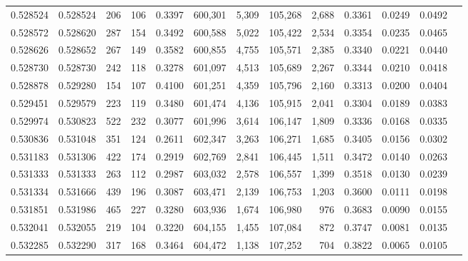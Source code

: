 \begin{tabular}{rrrrrrrrrrrrr}
0.528524 & 0.528524 &   206 &   106 &                                     0.3397 & 600,301 &   5,309 & 105,268 &   2,688 & 0.3361 & 0.0249 & 0.0492 \\
0.528572 & 0.528620 &   287 &   154 &                                     0.3492 & 600,588 &   5,022 & 105,422 &   2,534 & 0.3354 & 0.0235 & 0.0465 \\
0.528626 & 0.528652 &   267 &   149 &                                     0.3582 & 600,855 &   4,755 & 105,571 &   2,385 & 0.3340 & 0.0221 & 0.0440 \\
0.528730 & 0.528730 &   242 &   118 &                                     0.3278 & 601,097 &   4,513 & 105,689 &   2,267 & 0.3344 & 0.0210 & 0.0418 \\
0.528878 & 0.529280 &   154 &   107 &                                     0.4100 & 601,251 &   4,359 & 105,796 &   2,160 & 0.3313 & 0.0200 & 0.0404 \\
0.529451 & 0.529579 &   223 &   119 &                                     0.3480 & 601,474 &   4,136 & 105,915 &   2,041 & 0.3304 & 0.0189 & 0.0383 \\
0.529974 & 0.530823 &   522 &   232 &                                     0.3077 & 601,996 &   3,614 & 106,147 &   1,809 & 0.3336 & 0.0168 & 0.0335 \\
0.530836 & 0.531048 &   351 &   124 &                                     0.2611 & 602,347 &   3,263 & 106,271 &   1,685 & 0.3405 & 0.0156 & 0.0302 \\
0.531183 & 0.531306 &   422 &   174 &                                     0.2919 & 602,769 &   2,841 & 106,445 &   1,511 & 0.3472 & 0.0140 & 0.0263 \\
0.531333 & 0.531333 &   263 &   112 &                                     0.2987 & 603,032 &   2,578 & 106,557 &   1,399 & 0.3518 & 0.0130 & 0.0239 \\
0.531334 & 0.531666 &   439 &   196 &                                     0.3087 & 603,471 &   2,139 & 106,753 &   1,203 & 0.3600 & 0.0111 & 0.0198 \\
0.531851 & 0.531986 &   465 &   227 &                                     0.3280 & 603,936 &   1,674 & 106,980 &     976 & 0.3683 & 0.0090 & 0.0155 \\
0.532041 & 0.532055 &   219 &   104 &                                     0.3220 & 604,155 &   1,455 & 107,084 &     872 & 0.3747 & 0.0081 & 0.0135 \\
0.532285 & 0.532290 &   317 &   168 &                                     0.3464 & 604,472 &   1,138 & 107,252 &     704 & 0.3822 & 0.0065 & 0.0105 \\

\end{tabular}
